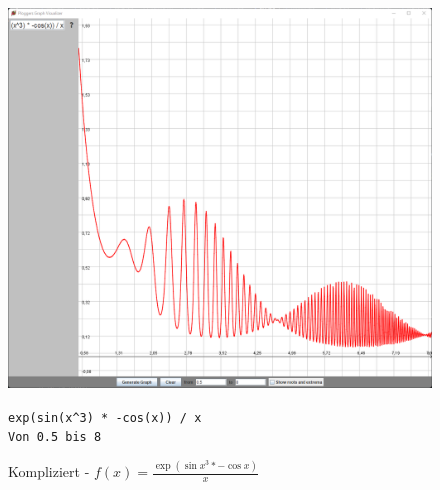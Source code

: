 \documentclass[12pt]{article}
\begin{document}
	\begin{figure}[!ht]
		\begin{center}
			\includegraphics[scale=0.5]{images/sample4.png}
		\end{center}
		\caption{Kompliziert - $f(x) = \frac{\exp(\sin{x^3} * -\cos{x})}{x}$}

		\begin{center}
			\texttt{exp(sin(x\textasciicircum 3) * -cos(x)) / x} \\
			\texttt{Von 0.5 bis 8}
		\end{center}
	\end{figure}
\end{document}
